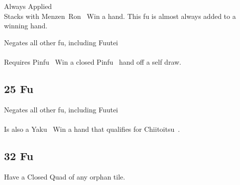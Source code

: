 	{\symbalert Always Applied \\
	\upgradesto Stacks with Menzen~Ron~}
	{Win a hand. This fu is almost always added to a winning hand.}

	{\symbnegate Negates all other fu, including Fuutei~ \\
	\closedhand \\
	\upgradesfromother Requires Pinfu~}
	{Win a closed Pinfu~ hand off a self draw.}


\subsection{25 Fu}\label{core:ssec:25-fu}

	{\symbnegate Negates all other fu, including Fuutei~ \\
	\closedhand \\
	\upgradesfromother Is also a Yaku~}
	{Win a hand that qualifies for Chiitoitsu~.}


\subsection{32 Fu}\label{core:ssec:32-fu}

	{}
	{Have a Closed Quad of any orphan tile.}